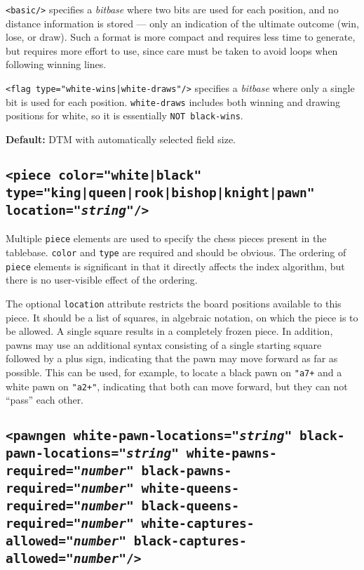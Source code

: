 \documentclass[11pt]{article}
\begin{document}
{\tt <basic/>} specifies a {\it bitbase} where two bits are used for
each position, and no distance information is stored --- only an
indication of the ultimate outcome (win, lose, or draw).  Such a format
is more compact and requires less time to generate, but requires more
effort to use, since care must be taken to avoid loops when following
winning lines.

{\tt <flag type="white-wins|white-draws"/>} specifies a {\it bitbase}
where only a single bit is used for each position.  {\tt white-draws}
includes both winning and drawing positions for white, so it is
essentially {\tt NOT black-wins}.

{\bf Default:} DTM with automatically selected field size.


\subsection{\tt <piece color="white|black" type="king|queen|rook|bishop|knight|pawn" \hfil\break\hbox{\qquad} location="{\it string}"/>}

Multiple {\tt piece} elements are used to specify the chess pieces
present in the tablebase. {\tt color} and {\tt type} are required and
should be obvious.  The ordering of {\tt piece} elements is
significant in that it directly affects the index algorithm,
but there is no user-visible effect of the ordering.

The optional {\tt location} attribute restricts the board positions
available to this piece.  It should be a list of squares, in algebraic
notation, on which the piece is to be allowed.  A single square
results in a completely frozen piece.  In addition, pawns may use an
additional syntax consisting of a single starting square followed by a
plus sign, indicating that the pawn may move forward as far as
possible.  This can be used, for example, to locate a black pawn on
{\tt "a7+} and a white pawn on {\tt "a2+"}, indicating that both can
move forward, but they can not ``pass'' each other.

\subsection{\tt <pawngen white-pawn-locations="{\it string}" black-pawn-locations="{\it string}" \hfil\break\hbox{\qquad} white-pawns-required="{\it number}" black-pawns-required="{\it number}" \hfil\break\hbox{\qquad} white-queens-required="{\it number}" black-queens-required="{\it number}" \hfil\break\hbox{\qquad} white-captures-allowed="{\it number}" black-captures-allowed="{\it number}"/>}
\end{document}
